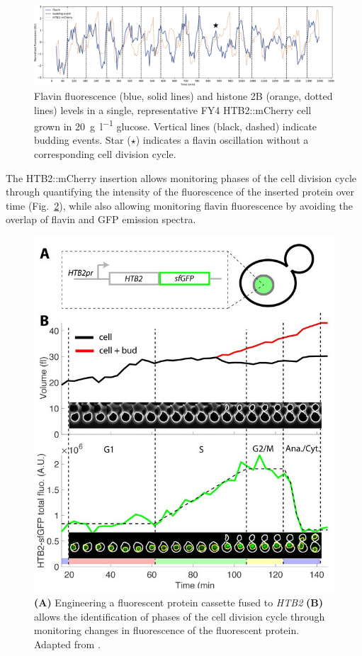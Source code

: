 \begin{figure}[hb!]
  \centering
    \includegraphics[width=1.0\linewidth]{single_birth_plot_edit.pdf}
    \caption[
      Flavin fluorescence and histone 2B levels in a single, representative FY4 HTB2::mCherry cell grown in \SI{20}{\gram~\litre^{-1}} glucose.
    ]{
      Flavin fluorescence (blue, solid lines) and histone 2B (orange, dotted lines) levels in a single, representative FY4 HTB2::mCherry cell grown in \SI{20}{\gram~\litre^{-1}} glucose.
      Vertical lines (black, dashed) indicate budding events.
      Star ($\star$) indicates a flavin oscillation without a corresponding cell division cycle.
    }
  \label{fig:biology-highglc-single}
\end{figure}

The HTB2::mCherry insertion allows monitoring phases of the cell division cycle through quantifying the intensity of the fluorescence of the inserted protein over time \parencite{garmendia-torresMultipleInputsEnsure2018} (Fig.\ \ref{fig:biology-htb2}), while also allowing monitoring flavin fluorescence by avoiding the overlap of flavin and GFP emission spectra.

\begin{figure}
  \centering
    \includegraphics[width=0.5\linewidth]{garmendia-torresMultipleInputsEnsure2018_1_adapted.jpg}
    \caption[
      Engineering a fluorescent protein cassette fused to \textit{HTB2} allows the identification of phases of the cell division cycle through monitoring changes in fluorescence of the fluorescent protein.
    ]{
      \textbf{(A)} Engineering a fluorescent protein cassette fused to \textit{HTB2} \textbf{(B)} allows the identification of phases of the cell division cycle through monitoring changes in fluorescence of the fluorescent protein.
      Adapted from \textcite{garmendia-torresMultipleInputsEnsure2018}.
    }
  \label{fig:biology-htb2}
\end{figure}

